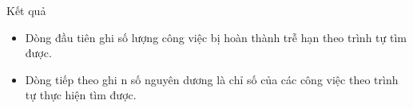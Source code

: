 Kết quả
\begin{itemize}
	\item     Dòng đầu tiên ghi số lượng công việc bị hoàn thành trễ hạn theo trình tự tìm được.   
	\item     Dòng tiếp theo ghi n số nguyên dương là chỉ số của các công việc theo trình tự thực hiện tìm được.   
\end{itemize}